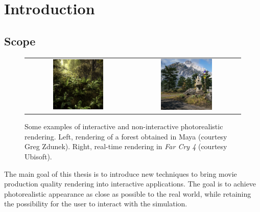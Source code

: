 \chapter{Introduction}
\label{sec:intro}
\section{Scope}
\begin{figure}
\centering
\begin{tabular}{@{}c@{}c@{}}
	 \includegraphics[width=0.5\textwidth]{figures/forest-maya-crop.jpg} & 	 \includegraphics[width=0.5\textwidth]{figures/far-cry-4-crop.jpg} \\
\end{tabular}
\caption{Some examples of interactive and non-interactive photorealistic rendering. Left, rendering of a forest obtained in Maya (courtesy Greg Zdunek). Right, real-time rendering in \emph{Far Cry 4} (courtesy Ubisoft). } 
\label{fig:main_examples}
\end{figure}
%
The main goal of this thesis is to introduce new techniques to bring movie production quality rendering into interactive applications.  The goal is to achieve photorealistic appearance as close as possible to the real world, while retaining the possibility for the user to interact with the simulation. 
